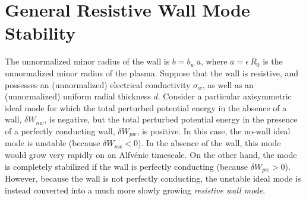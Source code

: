 \documentclass[12pt,prb,aps]{revtex4-1}
\begin{document}
\section{General Resistive Wall Mode Stability}\label{rwms}
The unnormalized minor radius of the wall is $b=b_w\,\bar{a}$, where $\bar{a}=\epsilon\,R_0$  is the unnormalized minor radius of the plasma. Suppose that the wall is resistive, and possesses an (unnormalized)  electrical conductivity $\sigma_w$, as well as an (unnormalized)  uniform radial thickness $d$. 
Consider a particular axisymmetric ideal mode for which the total perturbed potential energy in the absence of a wall, 
 $\delta W_{nw}$, is negative,  but the total perturbed potential energy in the presence of a perfectly conducting wall, $\delta W_{pw}$, is positive.  In this case,  the no-wall ideal mode is unstable (because $\delta W_{nw}<0$). In the absence of  the wall, this mode would grow very rapidly on an Alfv\'{e}nic timescale. On the other
 hand, the mode is completely stabilized if the wall is perfectly conducting (because $\delta W_{pw}>0$).  However, because the wall is not perfectly conducting, the unstable ideal mode is
 instead converted into a much more slowly growing {\em resistive wall mode}. 
 
\end{document}
